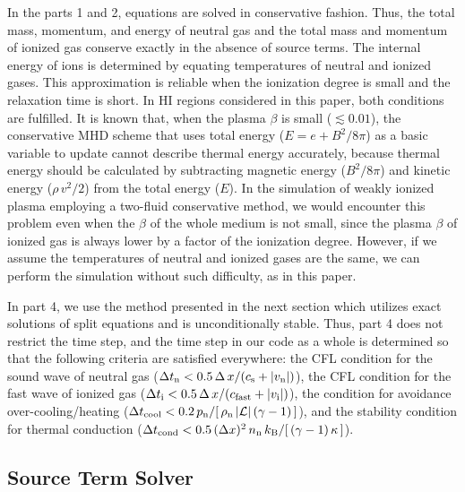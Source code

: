 \documentclass[12pt,preprint]{aastex}
\begin{document}
In the parts 1 and 2, equations are solved in conservative fashion.
Thus, the total mass, momentum, and energy of neutral gas and the total mass and momentum of ionized gas conserve exactly in the absence of source terms.
The internal energy of ions is determined by equating temperatures of neutral and ionized gases.
This approximation is reliable when the ionization degree is small and the relaxation time is short.
In HI regions considered in this paper, both conditions are fulfilled.
It is known that, when the plasma $\beta$ is small ($\lesssim 0.01$), the conservative MHD scheme that uses total energy ($E=e+B^{2}/8\pi$) as a basic variable to update cannot describe thermal energy accurately, because thermal energy should be calculated by subtracting magnetic energy ($B^{2}/8\pi$) and kinetic energy ($\rho\,v^{2}/2$) from the total energy ($E$).
In the simulation of weakly ionized plasma employing a two-fluid conservative method, we would encounter this problem even when the $\beta$ of the whole medium is not small, since the plasma $\beta$ of ionized gas is always lower by a factor of the ionization degree.
However, if we assume the temperatures of neutral and ionized gases are the same, we can perform the simulation without such difficulty, as in this paper.

In part 4, we use the method presented in the next section which utilizes exact solutions of split equations and is unconditionally stable.
Thus, part 4 does not restrict the time step, and the time step in our code as a whole is determined so that the following criteria are satisfied everywhere: the CFL condition for the sound wave of neutral gas ($\Delta t_{\rm n}<0.5\,\Delta\,x/(c_{\rm s}+|v_{\rm n}|)$), the CFL condition for the fast wave of ionized gas ($\Delta t_{\rm i}<0.5\,\Delta\,x/(c_{\rm fast}+|v_{\rm i}|)$), the condition for avoidance over-cooling/heating ($\Delta t_{\rm cool}<0.2\,p_{\rm n}/[\,\rho_{\rm n}\,|\mathcal{L}|\,(\gamma-1)\,]$), and the stability condition for thermal conduction ($\Delta t_{\rm cond}<0.5\,(\Delta x)^{2}\,n_{\rm n}\,k_{\rm B}/[\,(\gamma-1)\,\kappa\,]$).

\subsection{Source Term Solver}
\end{document}
